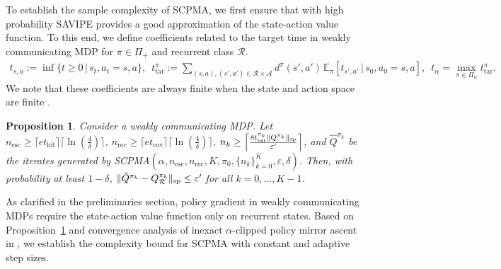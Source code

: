 \documentclass{article}
\newtheorem{proposition}[theorem]{Proposition}
\theoremstyle{definition}
\theoremstyle{remark}
\newcommand{\cA}{\mathcal{A}}
\newcommand{\cR}{\mathcal{R}}
\renewcommand{\sp}[1]{\|{#1}\|_\text{\rm sp}}
\begin{document}
To establish the sample complexity of SCPMA, we first ensure that with high probability SAVIPE provides a good approximation of the state-action value function. To this end, we define coefficients related to the target time in weakly communicating MDP for $\pi \in \Pi_+$ and recurrent class $\mathcal{R}$. 
\begin{align*}
t_{s,a} := \inf\{t\ge 0 \,|\, s_t, a_t = s,a\}, \,\,\, t^{\pi}_{\mathrm{tar}}
:= \!\!\!\!\!\!\!\!\!\!\!\!\!\!\!\sum_{(s,a),(s',a')\in\mathcal{R}\times \cA}\!\!\!\!\!\!\!\!\!\!\!\! \!\!\!d^{\pi}(s',a')\,\mathbb{E}_{\pi}\!\left[t_{s',a'} \,|\, s_0, a_0=s,a \right],  \,\,\, t_\alpha=\max_{\pi \in \Pi_\alpha}t^{\pi}_{\mathrm{tar}}.
\label{eq:Ctar}
\end{align*}
We note that these coefficients are always finite when the state and action space are finite \citep{levin2017Markov, lee2025multi}. 

\begin{proposition}\label{prop:SAVIPE}
Consider a weakly communicating MDP.  Let $n_{\mathrm{esc}} \ge\lceil e t_{\mathrm{hit}}\rceil \lceil\ln (\frac{4}{\delta})\rceil$, $n_{\mathrm{rec}}  \ge  \lceil  e t_{\mathrm{cov}}\rceil \lceil \ln (\frac{4}{\delta})\rceil$, $n_k \ge \left\lceil\frac{8 t^{\pi_k}_{\mathrm{tar}}\sp{Q^{\pi_k}}}{\varepsilon'}\right\rceil$,
and  $\hat{Q}^{\pi_k}$ be the iterates generated by SCPMA$(\alpha, n_{\mathrm{esc}},n_{\mathrm{rec}},K,\pi_0, \{n_{k}\}^K_{k=0}, \varepsilon, \delta)$.
Then, with probability at least $1-\delta$, $
\sp{\hat{Q}^{\pi_k}-Q_{\cR}^{\pi_k}}\le  \varepsilon'$ for all $k=0,\ldots,K-1$.
\end{proposition}

As clarified in the preliminaries section, policy gradient in weakly communicating MDPs require the state-action value function only on recurrent states. Based on Proposition~\ref{prop:SAVIPE} and convergence analysis of inexact $\alpha$-clipped policy mirror ascent in \cite{lee2025multi}, we establish the complexity bound for \mbox{\rm SCPMA} with constant and adaptive step sizes.
\end{document}
